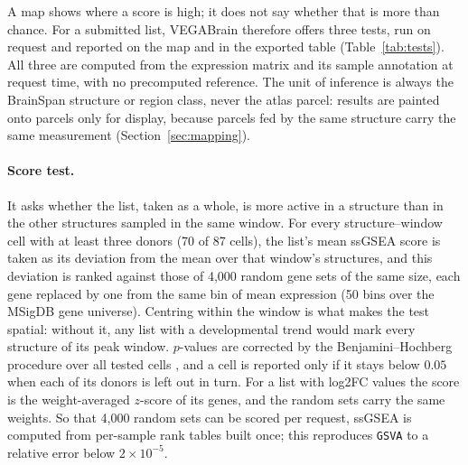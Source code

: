 \documentclass[pdflatex,sn-basic]{sn-jnl}
\begin{document}
A map shows where a score is high; it does not say whether that is more than
chance. For a submitted list, VEGABrain therefore offers three tests, run on
request and reported on the map and in the exported table
(Table~\ref{tab:tests}). All three are computed from the expression matrix and
its sample annotation at request time, with no precomputed reference. The unit
of inference is always the BrainSpan structure or region class, never the atlas
parcel: results are painted onto parcels only for display, because parcels fed
by the same structure carry the same measurement (Section~\ref{sec:mapping}).

\paragraph{Score test.} It asks whether the list, taken as a whole, is more
active in a structure than in the other structures sampled in the same window.
For every structure--window cell with at least three donors (70 of 87 cells),
the list's mean ssGSEA score is taken as its deviation from the mean over that
window's structures, and this deviation is ranked against those of 4{,}000
random gene sets of the same size, each gene replaced by one from the same bin of
mean expression (50 bins over the MSigDB gene universe). Centring within the
window is what makes the test spatial: without it, any list with a developmental
trend would mark every structure of its peak window. $p$-values are corrected by
the Benjamini--Hochberg procedure over all tested cells \citep{Benjamini1995},
and a cell is reported only if it stays below $0.05$ when each of its donors is
left out in turn. For a list with log2FC values the score is the
weight-averaged $z$-score of its genes, and the random sets carry the same
weights. So that 4{,}000 random sets can be scored per request, ssGSEA is
computed from per-sample rank tables built once; this reproduces \texttt{GSVA}
to a relative error below $2 \times 10^{-5}$.
\end{document}
